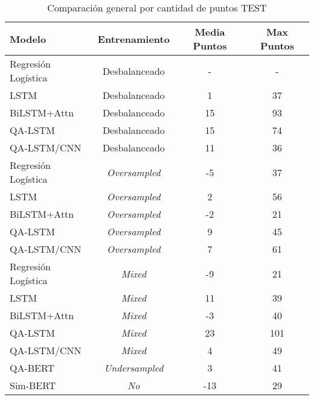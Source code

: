 \begin{table}[!tb]
  \begin{center}
    \caption{Comparación general por cantidad de puntos TEST}
    \begin{tabular}{l|c|c|c}
      \textbf{Modelo} & \textbf{Entrenamiento} & \textbf{Media Puntos} & \textbf{Max Puntos}\\
      \hline
      Regresión Logística & Desbalanceado & - & - \\
      LSTM & Desbalanceado & 1 & 37 \\
      BiLSTM+Attn & Desbalanceado & 15 & 93 \\
      QA-LSTM & Desbalanceado & 15 & 74 \\
      QA-LSTM/CNN & Desbalanceado & 11 & 36 \\

      Regresión Logística & \textit{Oversampled} & -5 & 37 \\
      LSTM & \textit{Oversampled} & 2 & 56 \\
      BiLSTM+Attn & \textit{Oversampled} & -2 & 21 \\
      QA-LSTM & \textit{Oversampled} & 9 & 45 \\
      QA-LSTM/CNN & \textit{Oversampled} & 7 & 61 \\

      Regresión Logística & \textit{Mixed} & -9 & 21 \\
      LSTM & \textit{Mixed} & 11 & 39 \\
      BiLSTM+Attn & \textit{Mixed} & -3 & 40 \\
      QA-LSTM & \textit{Mixed} & 23 & 101 \\
      QA-LSTM/CNN & \textit{Mixed} & 4 & 49 \\

      QA-BERT & \textit{Undersampled} & 3 & 41 \\
      Sim-BERT & \textit{No} & -13 & 29 \\
    \end{tabular}
  \end{center}
  \label{comparison_points_general}
\end{table}



